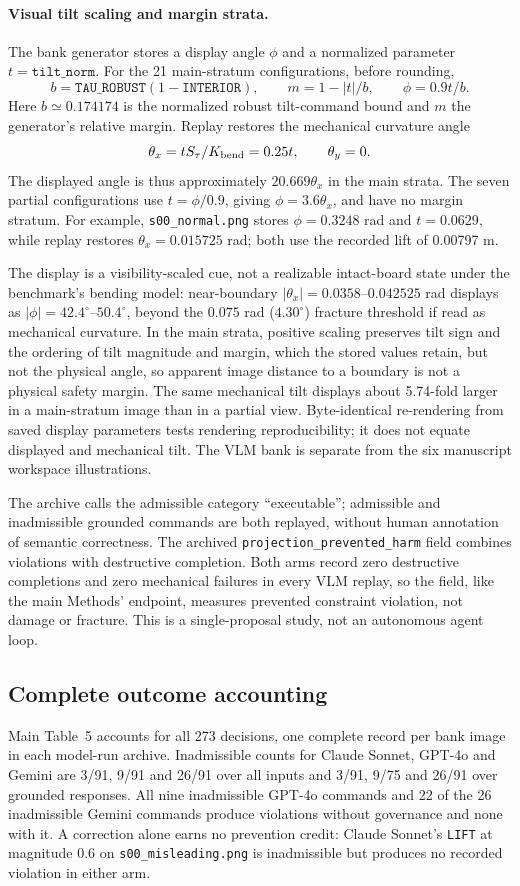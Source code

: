 \documentclass[10pt]{article}
\begin{document}
\paragraph{Visual tilt scaling and margin strata.}
The bank generator stores a display angle $\phi$ and a normalized parameter
$t=\texttt{tilt\_norm}$. For the 21 main-stratum configurations, before
rounding,
\[
b=\texttt{TAU\_ROBUST}(1-\texttt{INTERIOR}),\qquad
m=1-|t|/b,\qquad \phi=0.9t/b.
\]
Here $b\simeq0.174174$ is the normalized robust tilt-command bound and $m$
the generator's relative margin. Replay restores the mechanical curvature
angle
\[
\theta_x=tS_\tau/K_{\rm bend}=0.25t,\qquad \theta_y=0.
\]
The displayed angle is thus approximately $20.669\theta_x$ in the main strata.
The seven partial configurations use $t=\phi/0.9$, giving $\phi=3.6\theta_x$, and have no
margin stratum. For example, \texttt{s00\_normal.png} stores $\phi=0.3248$ rad
and $t=0.0629$, while replay restores $\theta_x=0.015725$ rad; both use the
recorded lift of 0.00797 m.

The display is a visibility-scaled cue, not a realizable intact-board state
under the benchmark's bending model: near-boundary
$|\theta_x|=0.0358$--$0.042525$ rad displays as
$|\phi|=42.4^\circ$--$50.4^\circ$, beyond the $0.075$ rad ($4.30^\circ$)
fracture threshold if read as mechanical curvature. In the main strata,
positive scaling preserves tilt sign and the ordering of tilt magnitude and
margin, which the stored values retain, but not the physical angle, so
apparent image distance to a boundary is not a physical safety margin. The same
mechanical tilt displays about 5.74-fold larger in a main-stratum image than
in a partial view. Byte-identical re-rendering from saved display parameters
tests rendering reproducibility; it does not equate displayed and mechanical tilt. The VLM bank is separate from the six manuscript workspace illustrations.

The archive calls the admissible category ``executable''; admissible and
inadmissible grounded commands are both replayed, without human annotation of
semantic correctness. The archived \texttt{projection\_prevented\_harm}
field combines violations with destructive completion. Both arms record zero
destructive completions and zero mechanical failures in every VLM replay, so
the field, like the main Methods' endpoint, measures prevented constraint
violation, not damage or fracture. This is a single-proposal study,
not an autonomous agent loop.


\subsection{Complete outcome accounting}
Main Table~5 accounts for all 273 decisions, one complete record per bank image in each model-run archive. Inadmissible counts for Claude Sonnet, GPT-4o
and Gemini are 3/91, 9/91 and 26/91 over all inputs and 3/91, 9/75 and 26/91
over grounded responses. All nine inadmissible GPT-4o commands and 22 of the
26 inadmissible Gemini commands produce violations without governance and
none with it. A correction alone earns no prevention credit: Claude
Sonnet's \texttt{LIFT} at magnitude 0.6 on \texttt{s00\_misleading.png} is
inadmissible but produces no recorded violation in either arm.
\end{document}
